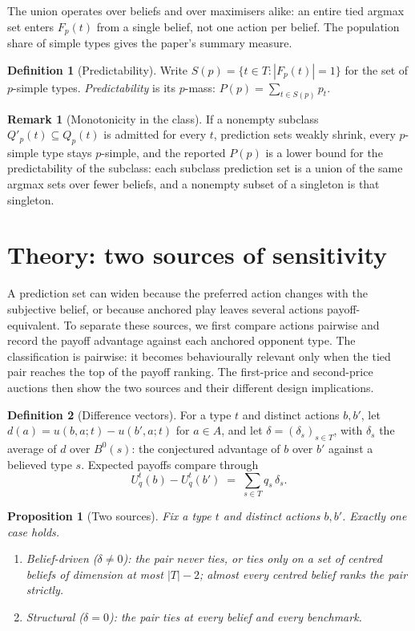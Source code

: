 \documentclass[12pt]{article}
\newtheorem{proposition}{Proposition}
\theoremstyle{definition}
\newtheorem{definition}{Definition}
\newtheorem{remark}{Remark}
\begin{document}
The union operates over beliefs and over maximisers alike: an entire tied argmax set enters $F_p(t)$ from a single belief, not one action per belief. The population share of simple types gives the paper's summary measure.

\begin{definition}[Predictability]\label{def:predictability}
Write $S(p) = \{ t \in T : |F_p(t)| = 1 \}$ for the set of $p$-simple types. \emph{Predictability} is its $p$-mass: $P(p) = \sum_{t \in S(p)} p_t$.
\end{definition}

\begin{remark}[Monotonicity in the class]\label{rem:mono}
If a nonempty subclass $Q'_p(t) \subseteq Q_p(t)$ is admitted for every $t$, prediction sets weakly shrink, every $p$-simple type stays $p$-simple, and the reported $P(p)$ is a lower bound for the predictability of the subclass: each subclass prediction set is a union of the same argmax sets over fewer beliefs, and a nonempty subset of a singleton is that singleton.
\end{remark}

\section{Theory: two sources of sensitivity}\label{sec:theory}

A prediction set can widen because the preferred action changes with the subjective belief, or because anchored play leaves several actions payoff-equivalent. To separate these sources, we first compare actions pairwise and record the payoff advantage against each anchored opponent type. The classification is pairwise: it becomes behaviourally relevant only when the tied pair reaches the top of the payoff ranking. The first-price and second-price auctions then show the two sources and their different design implications.

\begin{definition}[Difference vectors]\label{def:diff}
For a type $t$ and distinct actions $b, b'$, let $d(a) = u(b, a; t) - u(b', a; t)$ for $a \in A$, and let $\delta = (\delta_s)_{s \in T}$, with $\delta_s$ the average of $d$ over $B^0(s)$: the conjectured advantage of $b$ over $b'$ against a believed type $s$. Expected payoffs compare through
\[
U^t_q(b) - U^t_q(b') \;=\; \sum_{s \in T} q_s\, \delta_s .
\]
\end{definition}

\begin{proposition}[Two sources]\label{th:sources}
Fix a type $t$ and distinct actions $b, b'$. Exactly one case holds.
\begin{enumerate}
\item[i.] \textit{Belief-driven} ($\delta \neq 0$): the pair never ties, or ties only on a set of centred beliefs of dimension at most $|T| - 2$; almost every centred belief ranks the pair strictly.
\item[ii.] \textit{Structural} ($\delta = 0$): the pair ties at every belief and every benchmark.
\end{enumerate}
\end{proposition}
\end{document}
